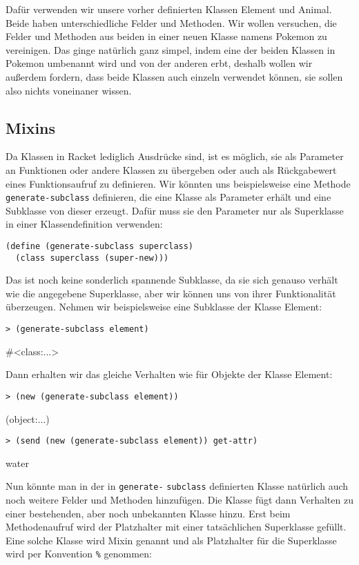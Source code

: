 Dafür verwenden wir unsere vorher definierten Klassen Element und Animal. Beide haben unterschiedliche Felder und Methoden. Wir wollen versuchen, die Felder und Methoden aus beiden in einer neuen Klasse namens Pokemon zu vereinigen. Das ginge natürlich ganz simpel, indem eine der beiden Klassen in Pokemon umbenannt wird und von der anderen erbt, deshalb wollen wir außerdem fordern, dass beide Klassen auch einzeln verwendet können, sie sollen also nichts voneinaner wissen. 

\subsection{Mixins}
Da Klassen in Racket lediglich Ausdrücke sind, ist es möglich, sie als Parameter an Funktionen oder andere Klassen zu übergeben oder auch als Rückgabewert eines Funktionsaufruf zu definieren. Wir könnten uns beispielsweise eine Methode \texttt{generate-subclass} definieren, die eine Klasse als Parameter erhält und eine Subklasse von dieser erzeugt. Dafür muss sie den Parameter nur als Superklasse in einer Klassendefinition verwenden:

\begin{lstlisting}
(define (generate-subclass superclass)
  (class superclass (super-new)))
\end{lstlisting} 

Das ist noch keine sonderlich spannende Subklasse, da sie sich genauso verhält wie die angegebene Superklasse, aber wir können uns von ihrer Funktionalität überzeugen. Nehmen wir beispielsweise eine Subklasse der Klasse Element:

\begin{lstlisting}
> (generate-subclass element) 
\end{lstlisting}
{\routput \#<class:...>}

Dann erhalten wir das gleiche Verhalten wie für Objekte der Klasse Element:

\begin{lstlisting}
> (new (generate-subclass element))
\end{lstlisting}
{\routput (object:...)}

\begin{lstlisting}
> (send (new (generate-subclass element)) get-attr)
\end{lstlisting}
{\rsymbol water}

Nun könnte man in der in \texttt{generate-} \texttt{subclass} definierten Klasse natürlich auch noch weitere Felder und Methoden hinzufügen. Die Klasse fügt dann Verhalten zu einer bestehenden, aber noch unbekannten Klasse hinzu. Erst beim Methodenaufruf wird der Platzhalter mit einer tatsächlichen Superklasse gefüllt. Eine solche Klasse wird Mixin genannt und als Platzhalter für die Superklasse wird per Konvention \texttt{\%} genommen:

